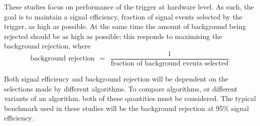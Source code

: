 
These studies focus on performance of the \egamma trigger at hardware level. As
such, the goal is to maintain a signal efficiency, fraction of signal events
selected by the trigger, as high as possible. At the same time the amount of
background being rejected should be as high as possible; this responds to
maximising the background rejection, where
%
\begin{equation*}
  \text{background~rejection} ~~=~~
  \frac1{\text{fraction~of~background~events~selected}}.
\end{equation*}
%

Both signal efficiency and background rejection will be dependent on the
selections made by different algorithms. To compare algorithms, or different
variants of an algorithm, both of these quantities must be considered.  The
typical benchmark used in these studies will be the background rejection at 95\%
signal efficiency.
